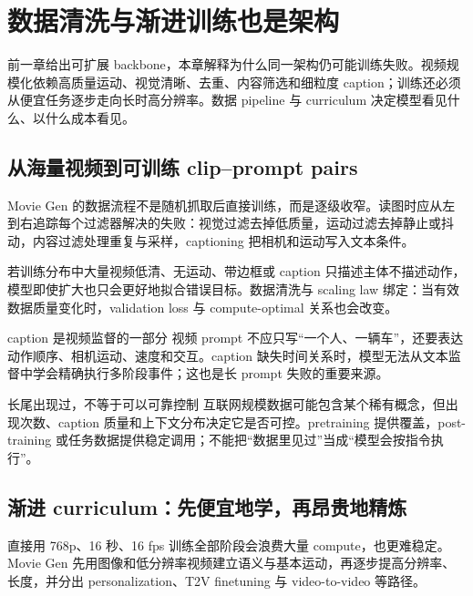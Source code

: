 \section{数据清洗与渐进训练也是架构}

前一章给出可扩展 backbone，本章解释为什么同一架构仍可能训练失败。视频规模化依赖高质量运动、视觉清晰、去重、内容筛选和细粒度 caption；训练还必须从便宜任务逐步走向长时高分辨率。数据 pipeline 与 curriculum 决定模型看见什么、以什么成本看见。

\subsection{从海量视频到可训练 clip--prompt pairs}

Movie Gen 的数据流程不是随机抓取后直接训练，而是逐级收窄。读图时应从左到右追踪每个过滤器解决的失败：视觉过滤去掉低质量，运动过滤去掉静止或抖动，内容过滤处理重复与采样，captioning 把相机和运动写入文本条件。


若训练分布中大量视频低清、无运动、带边框或 caption 只描述主体不描述动作，模型即使扩大也只会更好地拟合错误目标。数据清洗与 scaling law 绑定：当有效数据质量变化时，validation loss 与 compute-optimal 关系也会改变。

\begin{importantbox}{caption 是视频监督的一部分}
视频 prompt 不应只写“一个人、一辆车”，还要表达动作顺序、相机运动、速度和交互。caption 缺失时间关系时，模型无法从文本监督中学会精确执行多阶段事件；这也是长 prompt 失败的重要来源。
\end{importantbox}

\begin{warningbox}{长尾出现过，不等于可以可靠控制}
互联网规模数据可能包含某个稀有概念，但出现次数、caption 质量和上下文分布决定它是否可控。pretraining 提供覆盖，post-training 或任务数据提供稳定调用；不能把“数据里见过”当成“模型会按指令执行”。
\end{warningbox}


\subsection{渐进 curriculum：先便宜地学，再昂贵地精炼}

直接用 768p、16 秒、16 fps 训练全部阶段会浪费大量 compute，也更难稳定。Movie Gen 先用图像和低分辨率视频建立语义与基本运动，再逐步提高分辨率、长度，并分出 personalization、T2V finetuning 与 video-to-video 等路径。

